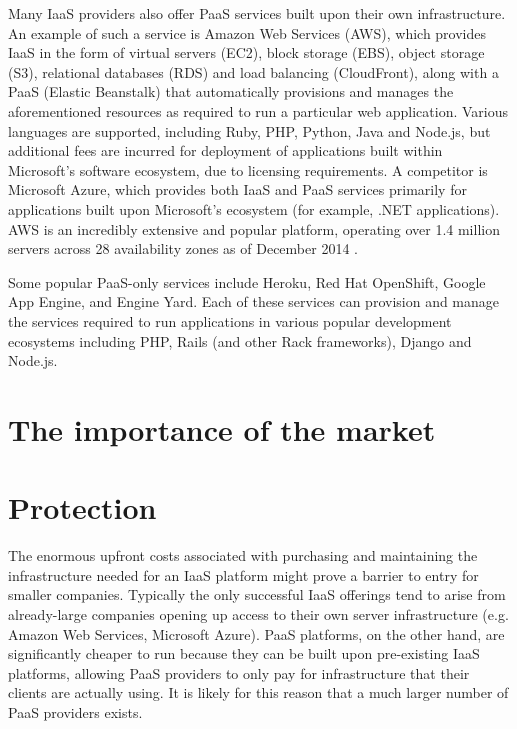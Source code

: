 \documentclass[a4paper]{proc}
\begin{document}
  Many IaaS providers also offer PaaS services built upon their own infrastructure. An example of such a service is Amazon Web Services (AWS), which provides IaaS in the form of virtual servers (EC2), block storage (EBS), object storage (S3), relational databases (RDS) and load balancing (CloudFront), along with a PaaS (Elastic Beanstalk) that automatically provisions and manages the aforementioned resources as required to run a particular web application. Various languages are supported, including Ruby, PHP, Python, Java and Node.js, but additional fees are incurred for deployment of applications built within Microsoft's software ecosystem, due to licensing requirements. A competitor is Microsoft Azure, which provides both IaaS and PaaS services primarily for applications built upon Microsoft's ecosystem (for example, .NET applications). AWS is an incredibly extensive and popular platform, operating over 1.4 million servers across 28 availability zones as of December 2014 \cite{Mathews2014}.

  Some popular PaaS-only services include Heroku, Red Hat OpenShift, Google App Engine, and Engine Yard. Each of these services can provision and manage the services required to run applications in various popular development ecosystems including PHP, Rails (and other Rack frameworks), Django and Node.js.

  \section{The importance of the market}
  \label{sec:market}


  \section{Protection}
  \label{sec:protection}


  The enormous upfront costs associated with purchasing and maintaining the infrastructure needed for an IaaS platform might prove a barrier to entry for smaller companies. Typically the only successful IaaS offerings tend to arise from already-large companies opening up access to their own server infrastructure (e.g. Amazon Web Services, Microsoft Azure). PaaS platforms, on the other hand, are significantly cheaper to run because they can be built upon pre-existing IaaS platforms, allowing PaaS providers to only pay for infrastructure that their clients are actually using. It is likely for this reason that a much larger number of PaaS providers exists.
\end{document}
